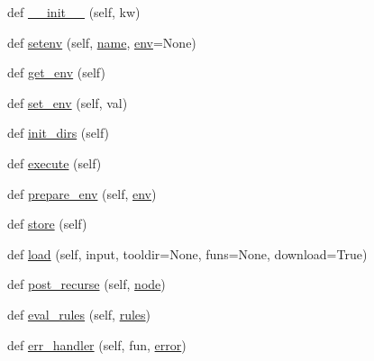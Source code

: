 \begin{DoxyCompactItemize}
\item 
def \hyperlink{classwaflib_1_1_configure_1_1_configuration_context_a0f139855aa53920d6f30a05e10253ab0}{\+\_\+\+\_\+init\+\_\+\+\_\+} (self, kw)
\item 
def \hyperlink{classwaflib_1_1_configure_1_1_configuration_context_a2ed4960105cdf08c13cd178367ae1818}{setenv} (self, \hyperlink{lib_2expat_8h_a1b49b495b59f9e73205b69ad1a2965b0}{name}, \hyperlink{classwaflib_1_1_configure_1_1_configuration_context_a390267f6d3529fe07447ffb4925ca533}{env}=None)
\item 
def \hyperlink{classwaflib_1_1_configure_1_1_configuration_context_a5f2dfad34690147826b09413246140f7}{get\+\_\+env} (self)
\item 
def \hyperlink{classwaflib_1_1_configure_1_1_configuration_context_ad30b269279dd9c24e6d892bb3b2fc583}{set\+\_\+env} (self, val)
\item 
def \hyperlink{classwaflib_1_1_configure_1_1_configuration_context_a782925b68e221c10f8e08433329364c9}{init\+\_\+dirs} (self)
\item 
def \hyperlink{classwaflib_1_1_configure_1_1_configuration_context_a2dadcc441cc31bb49159c709bae0ec32}{execute} (self)
\item 
def \hyperlink{classwaflib_1_1_configure_1_1_configuration_context_a913063288a6135c3105acf180e7f0f0c}{prepare\+\_\+env} (self, \hyperlink{classwaflib_1_1_configure_1_1_configuration_context_a390267f6d3529fe07447ffb4925ca533}{env})
\item 
def \hyperlink{classwaflib_1_1_configure_1_1_configuration_context_aadaed27da973f44dde6eaa890026be35}{store} (self)
\item 
def \hyperlink{classwaflib_1_1_configure_1_1_configuration_context_ae13e6fac1db3060edb50337f97b7be3f}{load} (self, input, tooldir=None, funs=None, download=True)
\item 
def \hyperlink{classwaflib_1_1_configure_1_1_configuration_context_a9620736938604c56dc26964b06a24e2e}{post\+\_\+recurse} (self, \hyperlink{structnode}{node})
\item 
def \hyperlink{classwaflib_1_1_configure_1_1_configuration_context_af1b5fdd6d958f8b996dba916c44ec9fa}{eval\+\_\+rules} (self, \hyperlink{classwaflib_1_1_configure_1_1_configuration_context_a279ad5a7c2630c4416afc36cad85a2db}{rules})
\item 
def \hyperlink{classwaflib_1_1_configure_1_1_configuration_context_acc349b079382fdac3d626eb46bd54b7e}{err\+\_\+handler} (self, fun, \hyperlink{sndfile__save_8m_ada4b423bc19e6ff5c5b514e55f518a82}{error})
\item 

\end{DoxyCompactItemize}
